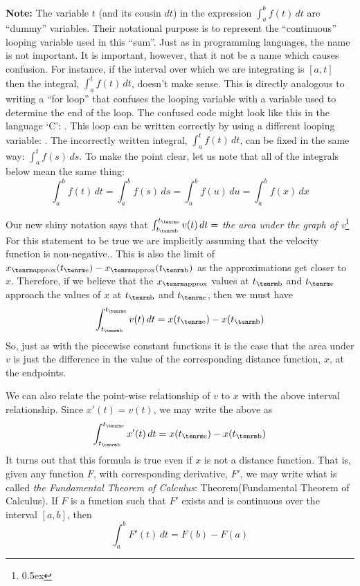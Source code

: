 {\bf Note:\/} The variable $t$ (and its cousin $dt$) in the expression $\int_{a}^{b} f(t) \, dt$
are ``dummy'' variables. Their notational purpose is to represent
the ``continuous'' looping variable used in this ``sum''. Just as in programming
languages, the name is not important. It is important, however, that it
not be a name which causes confusion. For instance, if the interval
over which we are integrating is $[a,t]$ then the integral,
$\int_{a}^{t} f(t) \, dt$, doesn't make sense. This is directly analogous 
to writing a ``for loop'' that confuses the looping variable with 
a variable used to determine the end of the loop. The confused code 
might look like this in the language `C':
.
This loop can be written correctly by using a different looping variable:
.
The incorrectly written integral, $\int_a^t f(t) \, dt$,  can be fixed in the same way:
$\int_a^t f(s) \, ds$.
To make the point clear, let us note that all of the integrals below mean 
the same thing:
$$
\int_{a}^{b} f(t) \, dt = \int_{a}^{b} f(s) \, ds = \int_{a}^{b} f(u) \, du
 = \int_{a}^{b} f(x) \, dx
$$

Our new shiny notation says that 
$\int_{t_{\rm b}}^{t_{\rm e}} v(t) \, dt = $ 
{\it the area under the graph of v}\footnote{\kern 0.5pt \raise 0.5ex \hbox{\dag}}%
{For this statement to be true we are implicitly assuming that the velocity function is non-negative.}. This is also the limit of 
$x_{\rm approx}(t_{\rm e}) - x_{\rm approx}(t_{\rm b}) $ as the approximations
get closer to $x$. Therefore, if we believe that the $x_{\rm approx}$ values 
at $t_{\rm b}$ and $t_{\rm e}$ approach the values of $x$ at 
$t_{\rm b}$ and $t_{\rm e}$, then we must have 
$$
\int_{t_{\rm b}}^{t_{\rm e}} v(t) \, dt = x(t_{\rm e}) - x(t_{\rm b})
$$
So, just as with the piecewise constant functions it is the case 
that the 
area under $v$ is just the difference in the value of the corresponding 
distance function, $x$, at the endpoints.

We can also relate the point-wise relationship of $v$ to $x$ with the 
above interval relationship. Since $x'(t) = v(t)$, we may write the above as 
$$
\int_{t_{\rm b}}^{t_{\rm e}} x'(t) \, dt = x(t_{\rm e}) - x(t_{\rm b})
$$
It turns out that this formula is true even if $x$ is not a distance function.
That is, given 
any function $F$, with corresponding derivative, $F'$, we may write 
what is called 
{\it the Fundamental Theorem of Calculus\/}:%
\proclaim Theorem(Fundamental Theorem of Calculus). If $F$ is a function such that $F'$ exists and is continuous 
over the interval $[a,b]$, then
$$
\int_{a}^{b} F'(t) \, dt = F(b) - F(a) 
$$

